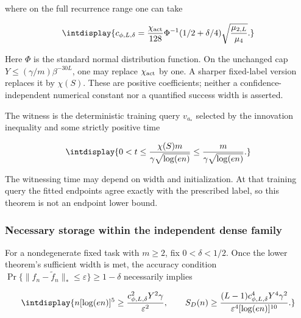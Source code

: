 
where on the full recurrence range one can take


\begingroup\renewcommand{\theHequation}{intdisplay.95}
\begin{equation*}
\intdisplay{
c_{\phi,L,\delta}=
\frac{\chi_{\rm act}}{128}
\Phi^{-1}(1/2+\delta/4)\sqrt{\frac{\mu_{2,L}}{\mu_4}}.
}
\end{equation*}
\endgroup


Here \(\Phi\) is the standard normal distribution function. On the unchanged cap \(Y\le(\gamma/m)\beta^{-30L}\), one may replace \(\chi_{\rm act}\) by one. A sharper fixed-label version replaces it by \(\chi(S)\). These are positive coefficients; neither a confidence-independent numerical constant nor a quantified success width is asserted.



The witness is the deterministic training query \(v_{a_*}\) selected by the innovation inequality and some strictly positive time


\begingroup\renewcommand{\theHequation}{intdisplay.96}
\begin{equation*}
\intdisplay{
0<t\le\frac{\chi(S)m}{\gamma\sqrt{\log(en)}}
\le\frac m{\gamma\sqrt{\log(en)}}.
}
\end{equation*}
\endgroup


The witnessing time may depend on width and initialization. At that training query the fitted endpoints agree exactly with the prescribed label, so this theorem is not an endpoint lower bound.


\subsubsection{Necessary storage within the independent dense family}



For a nondegenerate fixed task with \(m\ge2\), fix \(0<\delta<1/2\). Once the lower theorem's sufficient width is met, the accuracy condition \(\Pr\{\|f_n-\widetilde f_n\|_*\le\varepsilon\}\ge1-\delta\) necessarily implies


\begingroup\renewcommand{\theHequation}{intdisplay.97}
\begin{equation*}
\intdisplay{
n[\log(en)]^5\ge
\frac{c_{\phi,L,\delta}^2Y^2\gamma}{\varepsilon^2},
\qquad
S_D(n)\ge
\frac{(L-1)c_{\phi,L,\delta}^4Y^4\gamma^2}
{\varepsilon^4[\log(en)]^{10}}.
}
\end{equation*}
\endgroup

